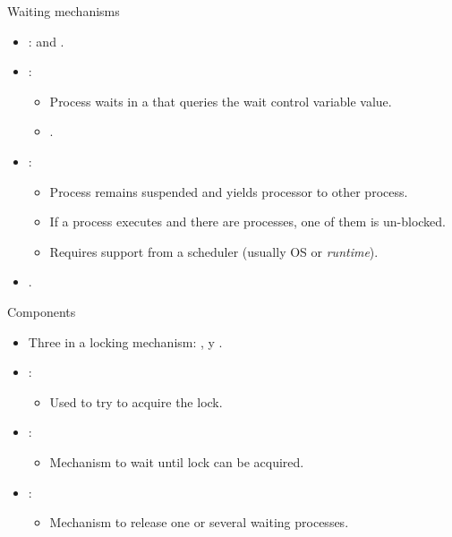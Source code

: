 \begin{frame}[t]{Waiting mechanisms}
\begin{itemize}
  \item {}:  and .

  \item {}:
    \begin{itemize}
      \item Process waits in a  that  
            queries the wait control variable value.
      \item {}.
    \end{itemize}

  \item {}:
    \begin{itemize}
      \item Process remains suspended and yields processor to other process.
      \item If a process executes  and there are 
             processes, one of them is un-blocked.
      \item Requires support from a scheduler (usually OS or \emph{runtime}).
    \end{itemize}

  \item {}.
\end{itemize}
\end{frame}

\begin{frame}[t]{Components}
\begin{itemize}
  \item Three  in a locking mechanism:
        ,  y .

  \item {}:
    \begin{itemize}
      \item Used to try to acquire the lock.
    \end{itemize}

  \item {}:
    \begin{itemize}
      \item Mechanism to wait until lock can be acquired.
    \end{itemize}

  \item {}:
    \begin{itemize}
      \item Mechanism to release one or several waiting processes.
    \end{itemize}
\end{itemize}
\end{frame}

